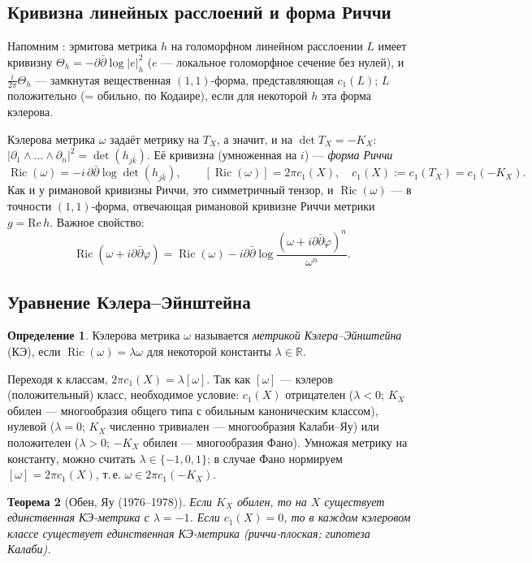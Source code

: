 \documentclass[11pt,a4paper]{article}
\theoremstyle{plain}
\newtheorem{theorem}{Теорема}[section]
\theoremstyle{definition}
\newtheorem{definition}[theorem]{Определение}
\theoremstyle{remark}
\newcommand{\R}{\mathbb{R}}
\DeclareMathOperator{\Ric}{Ric}
\begin{document}
\subsection{Кривизна линейных расслоений и форма Риччи}

Напомним \cite[\S\,6.2]{AG}: эрмитова метрика $h$ на голоморфном линейном расслоении $L$ имеет
кривизну $\Theta_h=-\partial\bar\partial\log|e|_h^2$ ($e$ --- локальное голоморфное сечение без нулей),
и $\frac i{2\pi}\Theta_h$ --- замкнутая вещественная $(1,1)$-форма, представляющая $c_1(L)$;
$L$ положительно (= обильно, по Кодаире), если для некоторой $h$ эта форма кэлерова.

Кэлерова метрика $\omega$ задаёт метрику на $T_X$, а значит, и на $\det T_X=-K_X$:
$|\partial_1\wedge\dots\wedge\partial_n|^2=\det(h_{j\bar k})$. Её кривизна (умноженная на $i$) ---
\emph{форма Риччи}
\[
\Ric(\omega)=-i\,\partial\bar\partial\log\det(h_{j\bar k}),\qquad [\Ric(\omega)]=2\pi c_1(X),\quad
c_1(X):=c_1(T_X)=c_1(-K_X).
\]
Как и у римановой кривизны Риччи, это симметричный тензор, и $\Ric(\omega)$ --- в точности
$(1,1)$-форма, отвечающая римановой кривизне Риччи метрики $g=\mathrm{Re}\,h$. Важное свойство:
\[
\Ric(\omega+i\partial\bar\partial\varphi)=\Ric(\omega)-i\partial\bar\partial\log\frac{(\omega+i\partial\bar\partial\varphi)^n}{\omega^n}.
\]

\subsection{Уравнение Кэлера--Эйнштейна}

\begin{definition}
Кэлерова метрика $\omega$ называется \emph{метрикой Кэлера--Эйнштейна} (КЭ), если
$\Ric(\omega)=\lambda\omega$ для некоторой константы $\lambda\in\R$.
\end{definition}

Переходя к классам, $2\pi c_1(X)=\lambda[\omega]$. Так как $[\omega]$ --- кэлеров (положительный)
класс, необходимое условие: $c_1(X)$ отрицателен ($\lambda<0$; $K_X$ обилен --- многообразия общего
типа с обильным каноническим классом), нулевой ($\lambda=0$; $K_X$ численно тривиален ---
многообразия Калаби--Яу) или положителен ($\lambda>0$; $-K_X$ обилен --- многообразия Фано). Умножая
метрику на константу, можно считать $\lambda\in\{-1,0,1\}$; в случае Фано нормируем
$[\omega]=2\pi c_1(X)$, т.\,е. $\omega\in2\pi c_1(-K_X)$.

\begin{theorem}[Обен, Яу (1976--1978)]
Если $K_X$ обилен, то на $X$ существует единственная КЭ-метрика с $\lambda=-1$. Если $c_1(X)=0$, то в
каждом кэлеровом классе существует единственная КЭ-метрика (риччи-плоская; гипотеза Калаби).
\end{theorem}
\end{document}
